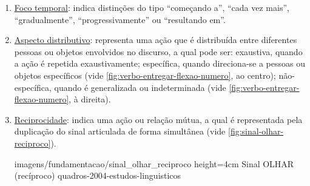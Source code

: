 \begin{enumerate}
\begin{enumerate}
            {imagens/fundamentacao/verbo_cuidar_flexao_temporal} %
            {height=5cm} %
            {Verbo CUIDAR flexionado em aspecto temporal incessante (esquerda), ininterrupto (centro) e habitual (direita)} %
            {quadros-2004-estudos-linguisticos} %


        \item \underline{Foco temporal}: indica distinções do tipo ``começando a'', ``cada vez mais'', ``gradualmente'', ``progressivamente'' ou ``resultando em''.


        \item \underline{Aspecto distributivo}: representa uma ação que é distribuída entre diferentes pessoas ou objetos envolvidos no discurso, a qual pode ser: exaustiva, quando a ação é repetida exaustivamente; específica, quando direciona-se a pessoas ou objetos específicos (vide \autoref{fig:verbo-entregar-flexao-numero}, ao centro); não-específica, quando é generalizada ou indeterminada (vide \autoref{fig:verbo-entregar-flexao-numero}, à direita).
        
        
        \item \underline{Reciprocidade}: indica uma ação ou relação mútua, a qual é representada pela duplicação do sinal articulada de forma simultânea (vide \autoref{fig:sinal-olhar-reciproco}).
        
            {imagens/fundamentacao/sinal_olhar_reciproco} %
            {height=4cm} %
            {Sinal OLHAR (recíproco)} %
            {quadros-2004-estudos-linguisticos} %
                
    \end{enumerate}



\end{enumerate}




